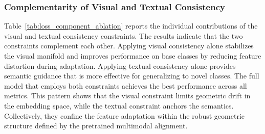 \documentclass{article}
\theoremstyle{plain}
\theoremstyle{definition}
\theoremstyle{remark}
\begin{document}
	\subsubsection{Complementarity of Visual and Textual Consistency}
	\begin{table}[h]
		\caption{Ablation study on the complementary roles of visual and textual consistency constraints. The results show that $\mathcal{L}^{\mathrm{img}}$ and $\mathcal{L}^{\mathrm{txt}}$ are complementary. While each single constraint improves over the baseline, combining them yields the best performance across all metrics, confirming their synergistic effect.}
		\label{tab:loss_component_ablation}
		\centering
	\end{table}
	Table~\ref{tab:loss_component_ablation} reports the individual contributions of the visual and textual consistency constraints. The results indicate that the two constraints complement each other. Applying visual consistency alone stabilizes the visual manifold and improves performance on base classes by reducing feature distortion during adaptation. Applying textual consistency alone provides semantic guidance that is more effective for generalizing to novel classes. The full model that employs both constraints achieves the best performance across all metrics. This pattern shows that the visual constraint limits geometric drift in the embedding space, while the textual constraint anchors the semantics. Collectively, they confine the feature adaptation within the robust geometric structure defined by the pretrained multimodal alignment.
\end{document}
